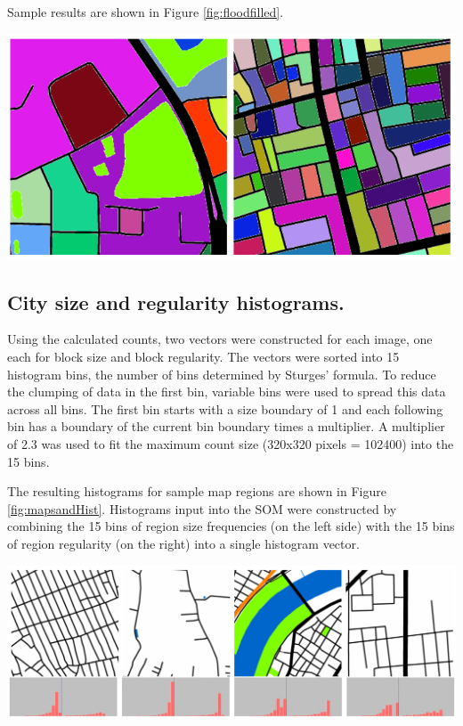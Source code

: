 \documentclass{nature}
\makeatletter
\renewenvironment*{figure}{\@float{figure}}{\end@float}
\makeatother
\begin{document}
\begin{methods}
Sample results are shown in Figure \ref{fig:floodfilled}.

\begin{figure}
\centering    
\includegraphics[scale=0.8]{Images/FloodSample.png}     
\caption{\bf Results of flood filled city blocks.}    
 \label{fig:floodfilled}  
\end{figure} 

\subsection{City size and regularity histograms.}\label{methodshist}

Using the calculated counts, two vectors were constructed for each image, one each for block size and block regularity. The vectors were sorted into 15 histogram bins, the number of bins determined by Sturges' formula\cite{Sturges1926}. To reduce the clumping of data in the first bin, variable bins were used to spread this data across all bins. The first bin starts with a size boundary of 1 and each following bin has a boundary of the current bin boundary times a multiplier. A multiplier of 2.3 was used to fit the maximum count size (320x320 pixels = 102400) into the 15 bins.

The resulting histograms for sample map regions are shown in Figure \ref{fig:mapsandHist}. Histograms input into the SOM were constructed by combining the 15 bins of region size frequencies (on the left side) with the 15 bins of region regularity (on the right) into a single histogram vector.


\begin{figure}
    \centering    
\includegraphics[scale=0.55]{Images/HistSamples.png}  
\caption{\bf Four samples of map regions (top) and resulting histograms (bottom). Region size and regularity are joined into a combined histogram, with size frequencies on the left side of the graph and regularity on the right.}    
 \label{fig:mapsandHist}  
\end{figure} 


\end{methods}
\end{document}
